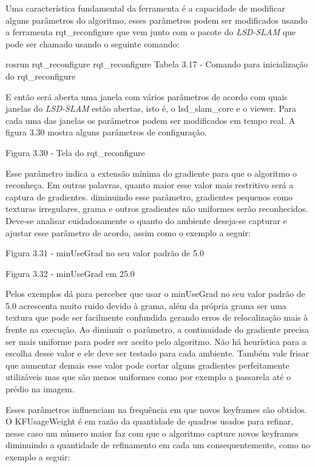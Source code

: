 Uma característica fundamental da ferramenta é a capacidade de modificar alguns parâmetros do algoritmo, esses parâmetros podem ser modificados usando a ferramenta rqt\_reconfigure que vem junto com o pacote do \textit{LSD-SLAM} que pode ser chamado usando o seguinte comando:

rosrun rqt\_reconfigure rqt\_reconfigure
Tabela 3.17 - Comando para inicialização do rqt\_reconfigure

E então será aberta uma janela com vários parâmetros de acordo com quais janelas do \textit{LSD-SLAM} estão abertas, isto é, o lsd\_slam\_core e o viewer. Para cada uma das janelas os parâmetros podem ser modificados em tempo real. A figura 3.30 mostra alguns parâmetros de configuração.

Figura 3.30 - Tela do rqt\_reconfigure


Esse parâmetro indica a extensão mínima do gradiente para que o algoritmo o reconheça. Em outras palavras, quanto maior esse valor mais restritivo será a captura de gradientes. diminuindo esse parâmetro, gradientes pequenos como texturas irregulares, grama e outros gradientes não uniformes serão reconhecidos. Deve-se analisar cuidadosamente o quanto do ambiente deseja-se capturar e ajustar esse parâmetro de acordo, assim como o exemplo a seguir:


Figura 3.31 - minUseGrad no seu valor padrão de 5.0

Figura 3.32 - minUseGrad em 25.0

Pelos exemplos dá para perceber que usar o minUseGrad no seu valor padrão de 5.0 acrescenta muito ruido devido à grama, além da própria grama ser uma textura que pode ser facilmente confundida gerando erros de relocalização mais à frente na execução. Ao diminuir o parâmetro, a continuidade do gradiente precisa ser mais uniforme para poder ser aceito pelo algoritmo. Não há heurística para a escolha desse valor e ele deve ser testado para cada ambiente. Também vale frisar que aumentar demais esse valor pode cortar alguns gradientes perfeitamente utilizáveis mas que são menos uniformes como por exemplo a passarela até o prédio na imagem.



Esses parâmetros influenciam na frequência em que novos keyframes são obtidos. O KFUsageWeight é em razão da quantidade de quadros usados para refinar, nesse caso um número maior faz com que o algoritmo capture novos keyframes diminuindo a quantidade de refinamento em cada um consequentemente, como no exemplo a seguir:


